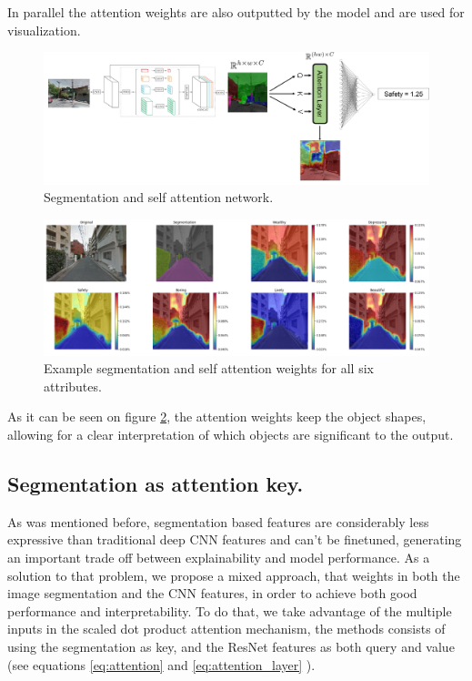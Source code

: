 In parallel the attention weights are also outputted by the model and are used for visualization.

\begin{figure}[ht]
	\begin{center}
	\includegraphics[width=1\textwidth]{./figures/self_attn.png}
	\caption[Self Attention network]{Segmentation and self attention network.}
	\label{fig:segrank_1}
	\end{center}
\end{figure}

\begin{figure}[ht]
	\begin{center}
	\includegraphics[width=1\textwidth]{./figures/self_attn_vis.png}
	\caption[Self Attention Model output]{Example segmentation and self attention weights for all six attributes.}
	\label{fig:segrank_attention}
	\end{center}
\end{figure}

As it can be seen on figure \ref{fig:segrank_attention}, the attention weights keep the object shapes,
allowing for a clear interpretation of which objects are significant to the output.

\subsection{Segmentation as attention key.}
As was mentioned before, segmentation based features are considerably less expressive than
traditional deep CNN features and can't be finetuned, generating an important trade off between explainability and model performance.
As a solution to that problem, we propose a mixed approach, that weights in both the image segmentation
and the CNN features, in order to achieve both good performance and interpretability. To do that,
we take advantage of the multiple inputs in the scaled dot product attention mechanism, the methods consists
of using the segmentation as key, and the ResNet features as both query and value (see equations \ref{eq:attention} and \ref{eq:attention_layer} ).

